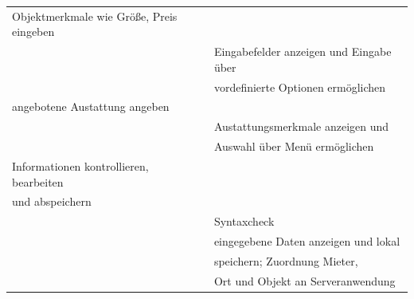 \begin{table}[H]
\begin{tabular}{l l}
Objektmerkmale wie Größe, Preis eingeben  &                                   \\[1ex]
                                           & Eingabefelder anzeigen und Eingabe über       \\[1ex]
                                           & vordefinierte Optionen ermöglichen         \\[1ex]
angebotene Austattung angeben           &                                   \\[1ex]
                                           & Austattungsmerkmale anzeigen und           \\[1ex]
                                            & Auswahl über Menü ermöglichen           \\[1ex]
Informationen kontrollieren, bearbeiten   &                                   \\[1ex]
und abspeichern                           &                                   \\[1ex]
                                          & Syntaxcheck  \\[1ex]
                                          & eingegebene Daten anzeigen und lokal  \\[1ex]
                                          & speichern; Zuordnung Mieter,    \\[1ex]
                                          & Ort und Objekt an Serveranwendung\\[1ex]



\hline
\end{tabular}
\label{tab:mietobjektAUC}
\end{table}

\newpage
